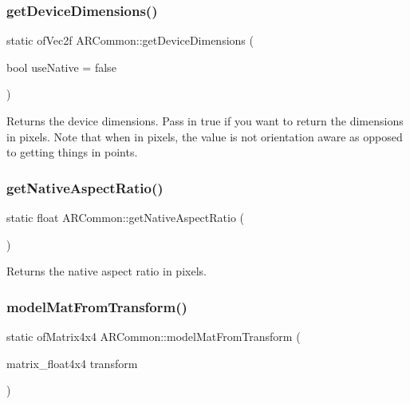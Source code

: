 \subsubsection{\texorpdfstring{get\+Device\+Dimensions()}{getDeviceDimensions()}}
{\footnotesize\ttfamily static of\+Vec2f A\+R\+Common\+::get\+Device\+Dimensions (\begin{DoxyParamCaption}\item[{bool}]{use\+Native = {\ttfamily false} }\end{DoxyParamCaption})\hspace{0.3cm}{\ttfamily [static]}}

Returns the device dimensions. Pass in true if you want to return the dimensions in pixels. Note that when in pixels, the value is not orientation aware as opposed to getting things in points. \mbox{\label{namespace_a_r_common_a00f3449531f154cba4a751128117052f}} 
\subsubsection{\texorpdfstring{get\+Native\+Aspect\+Ratio()}{getNativeAspectRatio()}}
{\footnotesize\ttfamily static float A\+R\+Common\+::get\+Native\+Aspect\+Ratio (\begin{DoxyParamCaption}{ }\end{DoxyParamCaption})\hspace{0.3cm}{\ttfamily [static]}}



Returns the native aspect ratio in pixels. 

\mbox{\label{namespace_a_r_common_aec58705c71590506c5f1f86e927f11e1}} 
\subsubsection{\texorpdfstring{model\+Mat\+From\+Transform()}{modelMatFromTransform()}}
{\footnotesize\ttfamily static of\+Matrix4x4 A\+R\+Common\+::model\+Mat\+From\+Transform (\begin{DoxyParamCaption}\item[{matrix\+\_\+float4x4}]{transform }\end{DoxyParamCaption})\hspace{0.3cm}{\ttfamily [static]}}



